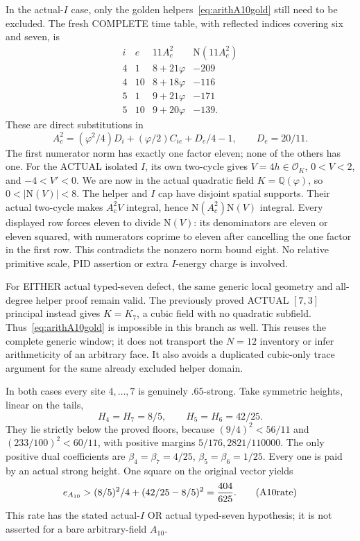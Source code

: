 \documentclass[11pt]{article}
\begin{document}
In the actual-\(I\) case, only the golden
helpers~\eqref{eq:arithA10gold} still need
to be excluded.
The fresh COMPLETE time table, with reflected
indices covering six and seven, is
\[
 \begin{array}{c|c|c|r}
 i&e&11A_c^2&\mathrm N(11A_c^2)\\ \hline
 4&1&8+21\varphi&-209\\
 4&10&8+18\varphi&-116\\
 5&1&9+21\varphi&-171\\
 5&10&9+20\varphi&-139 .
 \end{array}
\]
These are direct substitutions in
\[
 A_c^2=(\varphi^2/4)D_i+(\varphi/2)C_{ie}+D_e/4-1,
                        \qquad D_e=20/11 .
\]
The first numerator norm has exactly one
factor eleven; none of the others has one.
For the ACTUAL isolated \(I\), its own
two-cycle gives \(V=4h\in\mathcal O_K\),
\(0<V<2\), and \(-4<V'<0\).
We are now in the actual quadratic field
\(K=\mathbb Q(\varphi)\), so
\(0<|\mathrm N(V)|<8\).
The helper and \(I\) cap have disjoint
spatial supports.
Their actual two-cycle makes \(A_c^2V\)
integral, hence
\(\mathrm N(A_c^2)\mathrm N(V)\) integral.
Every displayed row forces eleven to divide
\(\mathrm N(V)\): its denominators are
eleven or eleven squared, with numerators
coprime to eleven after cancelling the one
factor in the first row.
This contradicts the nonzero norm bound eight.
No relative primitive scale, PID assertion
or extra \(I\)-energy charge is involved.

For EITHER actual typed-seven defect, the
same generic local geometry and all-degree
helper proof remain valid.
The previously proved ACTUAL \([7,3]\)
principal instead gives \(K=K_7\), a cubic
field with no quadratic subfield.
Thus~\eqref{eq:arithA10gold} is impossible
in this branch as well.
This reuses the complete generic window;
it does not transport the \(N=12\) inventory
or infer arithmeticity of an arbitrary face.
It also avoids a duplicated cubic-only
trace argument for the same already excluded
helper domain.

In both cases every site \(4,\ldots,7\)
is genuinely \(.65\)-strong.
Take symmetric heights, linear on the tails,
\[
                  H_4=H_7=8/5,\qquad H_5=H_6=42/25 .
\]
They lie strictly below the proved floors,
because \((9/4)^2<56/11\) and
\((233/100)^2<60/11\), with positive
margins \(5/176,2821/110000\).
The only positive dual coefficients are
\(\beta_4=\beta_7=4/25\),
\(\beta_5=\beta_6=1/25\).
Every one is paid by an actual strong height.
One square on the original vector yields
\[
                       e_{A_{10}}>
                   (8/5)^2/4+(42/25-8/5)^2
                   ={404\over625}.
\tag{A10rate}\label{eq:arithA10conditionalrate}
\]
This rate has the stated actual-\(I\) OR
actual typed-seven hypothesis; it is not
asserted for a bare arbitrary-field \(A_{10}\).
\end{document}
